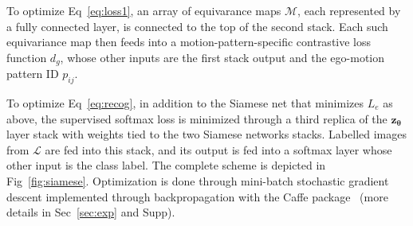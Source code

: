 \documentclass[10pt,twocolumn,letterpaper]{article}
\begin{document}
To optimize Eq~\eqref{eq:loss1}, an array of equivarance maps $\mathcal{M}$, each represented by a fully connected layer, is connected to the top of the second stack. Each such equivariance map then feeds into a motion-pattern-specific contrastive loss function $d_{g}$, whose other inputs are the first stack output and the ego-motion pattern ID $p_{ij}$.

To optimize Eq~\eqref{eq:recog}, in addition to the Siamese net that minimizes $L_{e}$ as above, the supervised softmax loss is minimized through a third replica of the $\mathbf{z}_{\bm{\theta}}$ layer stack with weights tied to the two Siamese networks stacks. {Labelled images from $\mathcal{L}$ are fed into this stack, and its output is fed into} a softmax layer whose other input is the class label. The complete scheme is depicted in Fig~\ref{fig:siamese}.
Optimization is done through mini-batch stochastic gradient descent implemented through backpropagation with the Caffe package~\cite{caffe} (more details in Sec~\ref{sec:exp} and Supp).
\end{document}
